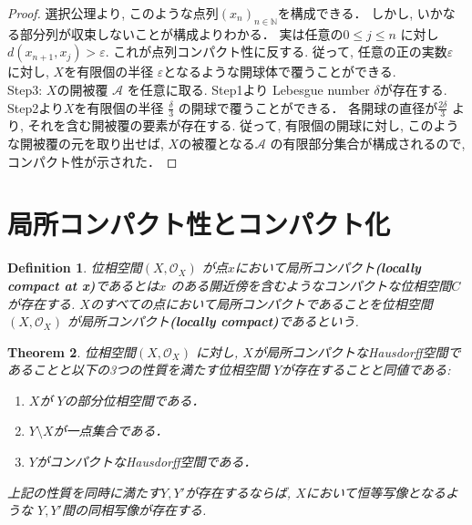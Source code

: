 \documentclass[lualatex]{ltjsbook}
\newtheorem{theorem}{Theorem}[chapter]
\newtheorem{definition}[theorem]{Definition}
\theoremstyle{remark}
\theoremstyle{plain}
\begin{document}
\begin{proof}
	 選択公理より,  このような点列$\left( x_n \right) _{n \in  \mathbb{N}}$を構成できる．
	 しかし,  いかなる部分列が収束しないことが構成よりわかる．
	 実は任意の$0 \le j \le n$ に対し$d(x_{n+1}, x_j)>\varepsilon$. 
	 これが点列コンパクト性に反する. 
	 従って,  任意の正の実数$\varepsilon$ に対し,  $X$を有限個の半径 $\varepsilon$となるような開球体で覆うことができる.\\
	 Step3:  $X$の開被覆 $\mathcal{A}$ を任意に取る. 
	 Step1より Lebesgue number $\delta$が存在する. 
	 Step2より$X$を有限個の半径 $\frac{\delta}{3}$ の開球で覆うことができる．
	 各開球の直径が$\frac{2\delta}{3}$ より,  
	 それを含む開被覆の要素が存在する. 
	 従って, 有限個の開球に対し,  このような開被覆の元を取り出せば, 
	 $X$の被覆となる$\mathcal{A}$ の有限部分集合が構成されるので,  
	 コンパクト性が示された．
\end{proof}

\section{局所コンパクト性とコンパクト化}

\begin{definition}
	位相空間$\left( X ,  \mathcal{O}_{X} \right)$ が点$x$において局所コンパクト\textbf{(locally compact at x)}であるとは$x$ のある開近傍を含むようなコンパクトな位相空間$C$が存在する.  $X$のすべての点において局所コンパクトであることを位相空間 $\left( X ,  \mathcal{O}_{X} \right)$ が局所コンパクト\textbf{(locally compact)}であるという.
\end{definition}

\begin{theorem}
	位相空間$\left( X ,  \mathcal{O}_{X} \right)$ に対し,  $X$が局所コンパクトなHausdorff空間であることと以下の3つの性質を満たす位相空間 $Y$が存在することと同値である:
	 \begin{enumerate}
		\item $X$が $Y$の部分位相空間である．
		\item $Y \setminus X$が一点集合である．
		\item $Y$がコンパクトなHausdorff空間である．
	\end{enumerate}
	上記の性質を同時に満たす$Y, Y'$が存在するならば,   $X$において恒等写像となるような $Y, Y'$間の同相写像が存在する.
\end{theorem}
\end{document}
